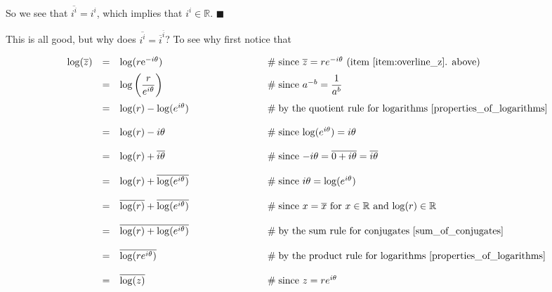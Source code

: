 \documentclass{article}
\theoremstyle{definition}
\begin{document}
\medskip
\noindent
So we see that $\overline{i^i} = i^i$, which implies that $i^i \in
\mathbb{R}$. $\blacksquare$ 

\bigskip
\noindent
This is all good, but why does $\overline{i^i} = {\overline{i}}^{\overline{i}}$?
To see why first notice that

\medskip
\begin{equation*}
\begin{array}{llll}
\log (\overline{z})
&=& \log(r \mathrm{e}^{-i\theta})
		&\hspace{7em} \mathrel{\#} \text{since $\overline{z} = re^{-i\theta}$ (item \ref{item:overline_z}. above)} \\
[5pt]
&=& \log \left (\dfrac{r}{e^{i\theta}} \right) 	
		&\hspace{7em} \mathrel{\#} \text{since $a^{-b} = \dfrac{1}{a^b}$} \\
[12pt]
&=& \log(r) - \log(e^{i\theta})
		&\hspace{7em} \mathrel{\#} \text{by the quotient rule for logarithms \cite{properties_of_logarithms}} \\
[12pt]
&=& \log(r) - i\theta
		&\hspace{7em} \mathrel{\#} \text{since $\log({e^{i\theta}}) = i\theta$} \\
[12pt]
&=& \log(r) + \overline{i\theta}
		&\hspace{7em} \mathrel{\#} \text{since $-i\theta = \overline{0+i\theta} = \overline{i\theta}$} \\
[12pt]
&=& \log(r) + \overline{\log(e^{i\theta})}
		&\hspace{7em} \mathrel{\#} \text{since $i\theta = \log(e^{i\theta})$} \\
[12pt]
&=& \overline{\log(r)} + \overline{\log(e^{i\theta})}
		&\hspace{7em} \mathrel{\#} \text{since $x = \overline{x}$ for $x \in \mathbb{R}$ 
		and $\log(r) \in \mathbb{R}$} \\
[12pt]
&=& \overline{\log(r) + \log(e^{i\theta})}
		&\hspace{7em} \mathrel{\#} \text{by the sum rule for conjugates \cite{sum_of_conjugates}} \\
[12pt]
&=& \overline{\log(re^{i\theta})}
		&\hspace{7em} \mathrel{\#} \text{by the product rule for logarithms \cite{properties_of_logarithms}} \\
[12pt]
&=& \overline{\log(z)} 
		&\hspace{7em} \mathrel{\#} \text{since $z = re^{i\theta}$}	
\end{array}
\end{equation*}
\end{document}
